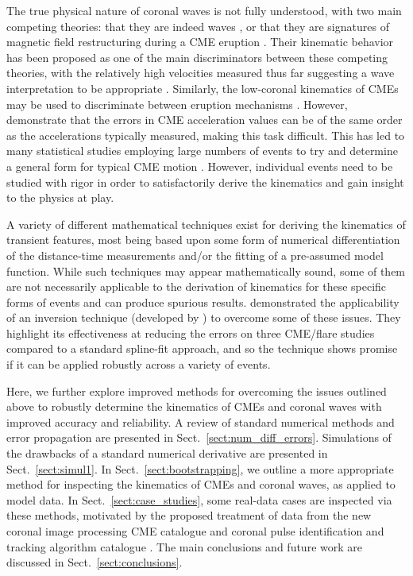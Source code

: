\documentclass[structabstract]{aa}
\begin{document}
The true physical nature of coronal waves is not fully understood, with two main competing theories: that they are indeed waves \citep[e.g.,][]{2010ApJ...716L..57V, 2012ApJ...754....7S}, or that they are signatures of magnetic field restructuring during a CME eruption \citep[e.g.,][]{2011ApJ...738..167S,2011ApJ...732L..20C}. Their kinematic behavior has been proposed as one of the main discriminators between these competing theories, with the relatively high velocities measured thus far suggesting a wave interpretation to be appropriate \citep{2011A&A...532A.151W, 2012ApJ...753..112Z}. Similarly, the low-coronal kinematics of CMEs may be used to discriminate between eruption mechanisms \citep[see, for example,][and the CME models discussed therein]{2010A&A...516A..44L}. However, \citet{2007ApJ...657.1117W} demonstrate that the errors in CME acceleration values can be of the same order as the accelerations typically measured, making this task difficult. This has led to many statistical studies employing large numbers of events to try and determine a general form for typical CME motion \citep[e.g.,][]{2000GeoRL..27..145G, 2003AdSpR..32.2637D, 2006ApJ...649.1100Z}. However, individual events need to be studied with rigor in order to satisfactorily derive the kinematics and gain insight to the physics at play.

A variety of different mathematical techniques exist for deriving the kinematics of transient features, most being based upon some form of numerical differentiation of the distance-time measurements and/or the fitting of a pre-assumed model function. While such techniques may appear mathematically sound, some of them are not necessarily applicable to the derivation of kinematics for these specific forms of events and can produce spurious results. \citet{2010ApJ...712.1410T} demonstrated the applicability of an inversion technique (developed by \citealt{2005SoPh..227..299K}) to overcome some of these issues. They highlight its effectiveness at reducing the errors on three CME/flare studies compared to a standard spline-fit approach, and so the technique shows promise if it can be applied robustly across a variety of events.

Here, we further explore improved methods for overcoming the issues outlined above to robustly determine the kinematics of CMEs and coronal waves with improved accuracy and reliability. A review of standard numerical methods and error propagation are presented in Sect.~\ref{sect:num_diff_errors}. Simulations of the drawbacks of a standard numerical derivative are presented in Sect.~\ref{sect:simul1}. In Sect.~\ref{sect:bootstrapping}, we outline a more appropriate method for inspecting the  kinematics of CMEs and coronal waves, as applied to model data. In Sect.~\ref{sect:case_studies}, some real-data cases are inspected via these methods, motivated by the proposed treatment of data from the new coronal image processing CME catalogue \citep[CORIMP;][]{2012ApJ...752..144M, 2012ApJ...752..145B} and coronal pulse identification and tracking algorithm catalogue \citep[CorPITA;][]{2011A&A...531A..42L}. The main conclusions and future work are discussed in Sect.~\ref{sect:conclusions}.
\end{document}
